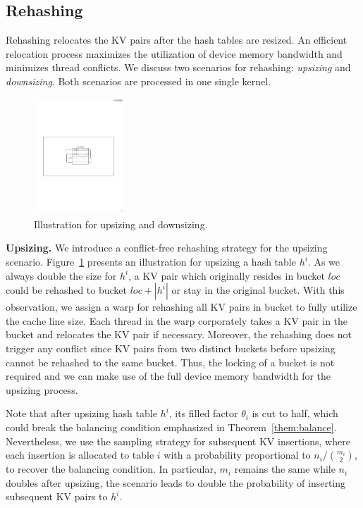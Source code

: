\subsection{Rehashing}\label{sec:dyn:rehash}
Rehashing relocates the KV pairs after the hash tables are resized. An efficient relocation process maximizes the utilization of device memory bandwidth and minimizes thread conflicts. 
We discuss two scenarios for rehashing: \emph{upsizing} and \emph{downsizing}. Both scenarios are processed in one single kernel. 

\begin{figure}[t]
	\centering
	\includegraphics[width=0.3\textwidth]{fig/Upsize.pdf}
	\caption{Illustration for upsizing and downsizing.}
	\label{fig:upsize}
\end{figure}
\vspace{1mm}\noindent\textbf{Upsizing.} 
We introduce a conflict-free rehashing strategy for the upsizing scenario. 
Figure~\ref{fig:upsize} presents an illustration for upsizing a hash table $h^i$. 
As we always double the size for $h^i$, 
a KV pair which originally resides in bucket $loc$ could be rehashed to bucket $loc+|h^i|$ or stay in the original bucket. 
With this observation, we assign a warp for rehashing all KV pairs in bucket to fully utilize the cache line size. 
Each thread in the warp corporately takes a KV pair in the bucket and relocates the KV pair if necessary.
Moreover, the rehashing does not trigger any conflict since KV pairs from two distinct buckets before upsizing cannot be rehashed to the same bucket.  
Thus, the locking of a bucket is not required and we can make use of the full device memory bandwidth for the upsizing process.  

Note that after upsizing hash table $h^i$, its filled factor $\theta_i$ is cut to half, which could break the balancing condition emphasized in Theorem~\ref{them:balance}. Nevertheless, we use the sampling strategy for subsequent KV insertions, where each insertion is allocated to table $i$ with a probability proportional to $n_i/\binom{m_i}{2}$, to recover the balancing condition. In particular, $m_i$ remains the same while $n_i$ doubles after upsizing, the scenario leads to double the probability of inserting subsequent KV pairs to $h^i$. 


